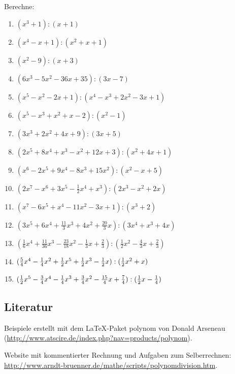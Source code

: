 		Berechne:
		\begin{enumerate}
			\item $(x^3+1):(x+1)$
			\item $(x^4-x+1):(x^2+x+1)$
			\item $(x^2-9):(x+3)$
			\item $(6x^3-5x^2-36x+35):(3x-7)$
			\item $(x^5-x^2-2x+1) : (x^4-x^3+2x^2-3x+1)$
			\item $(x^5-x^3+x^2+x-2) : (x^2-1)$
			\item $(3x^3+2x^2+4x+9) : (3x+5)$
			\item $(2x^5 + 8x^4 +x^3-x^2 + 12 x +3): (x^2+4x+1)$
			\item $(x^6-2x^5+9x^4-8x^3+15x^2):(x^2-x+5)$
			\item $(2x^7 - x^6 + 3x^5 - \tfrac{1}{2}x^4 + x^3) : (2x^3 - x^2 + 2x)$
			\item $(x^7-6x^5+x^4-11x^2-3x+1):(x^3+2)$
			\item $(3x^5 +6x^4 +\tfrac{11}{3}x^3 + 4x^2 + \tfrac{20}{3}x):(3x^4 +x^3+4x)$
			\item $(\tfrac{1}{6}x^4 + \tfrac{11}{36}x^3 - \tfrac{23}{18}x^2 -
			\tfrac{1}{3}x + \tfrac{2}{3}) : (\tfrac{1}{2}x^2 - \tfrac{4}{3}x +
			\tfrac{2}{3})$
			\item $(\tfrac{5}{4}x^4- \tfrac{1}{4}x^2  + \tfrac{1}{2} x^5 + \tfrac{1}{2} x^3 -\tfrac{1}{2} x)
			: (\tfrac{1}{2} x^2 +x)$
			\item $(\tfrac{1}{2} x^5 - \tfrac{3}{4}x^4 - \tfrac{1}{4}x^3 + \tfrac{3}{4}x^2 -
			\tfrac{15}{4}x + \tfrac{7}{4}) : (\tfrac{1}{2} x -\tfrac{1}{4})$
		\end{enumerate}
		
	\subsection{Literatur}
	
		Beispiele erstellt mit dem \LaTeX-Paket \glq polynom\grq{} von Donald
		Arseneau (\url{http://www.atscire.de/index.php?nav=products/polynom}).
		
		Website mit kommentierter Rechnung und Aufgaben zum Selberrechnen:
		\url{http://www.arndt-bruenner.de/mathe/scripts/polynomdivision.htm}.